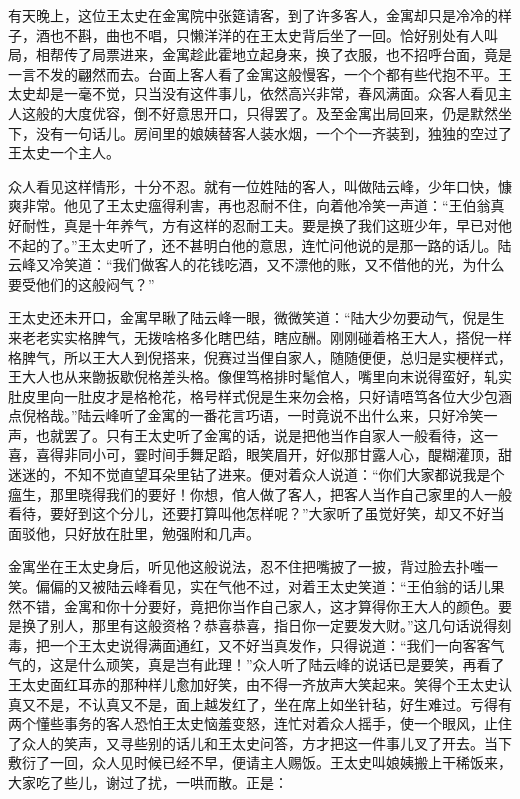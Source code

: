 \documentclass[12pt,UTF8]{ctexbook}
\begin{document}
{{{有天晚上，这位王太史在金寓院中张筵请客，到了许多客人，金寓却只是冷冷的样子，酒也不斟，曲也不唱，只懒洋洋的在王太史背后坐了一回。恰好别处有人叫局，相帮传了局票进来，金寓趁此霍地立起身来，换了衣服，也不招呼台面，竟是一言不发的翩然而去。台面上客人看了金寓这般慢客，一个个都有些代抱不平。王太史却是一毫不觉，只当没有这件事儿，依然高兴非常，春风满面。众客人看见主人这般的大度优容，倒不好意思开口，只得罢了。及至金寓出局回来，仍是默然坐下，没有一句话儿。房间里的娘姨替客人装水烟，一个个一齐装到，独独的空过了王太史一个主人。

众人看见这样情形，十分不忍。就有一位姓陆的客人，叫做陆云峰，少年口快，慷爽非常。他见了王太史瘟得利害，再也忍耐不住，向着他冷笑一声道：“王伯翁真好耐性，真是十年养气，方有这样的忍耐工夫。要是换了我们这班少年，早已对他不起的了。”王太史听了，还不甚明白他的意思，连忙问他说的是那一路的话儿。陆云峰又冷笑道：“我们做客人的花钱吃酒，又不漂他的账，又不借他的光，为什么要受他们的这般闷气？”

王太史还未开口，金寓早瞅了陆云峰一眼，微微笑道：“陆大少勿要动气，倪是生来老老实实格脾气，无拨啥格多化瞎巴结，瞎应酬。刚刚碰着格王大人，搭倪一样格脾气，所以王大人到倪搭来，倪赛过当俚自家人，随随便便，总归是实梗样式，王大人也从来朆扳歇倪格差头格。像俚笃格排时髦倌人，嘴里向末说得蛮好，轧实肚皮里向一肚皮才是格枪花，格号样式倪是生来勿会格，只好请唔笃各位大少包涵点倪格哉。”陆云峰听了金寓的一番花言巧语，一时竟说不出什么来，只好冷笑一声，也就罢了。只有王太史听了金寓的话，说是把他当作自家人一般看待，这一喜，喜得非同小可，霎时间手舞足蹈，眼笑眉开，好似那甘露人心，醍糊灌顶，甜迷迷的，不知不觉直望耳朵里钻了进来。便对着众人说道：“你们大家都说我是个瘟生，那里晓得我们的要好！你想，倌人做了客人，把客人当作自己家里的人一般看待，要好到这个分儿，还要打算叫他怎样呢？”大家听了虽觉好笑，却又不好当面驳他，只好放在肚里，勉强附和几声。

金寓坐在王太史身后，听见他这般说法，忍不住把嘴披了一披，背过脸去扑嗤一笑。偏偏的又被陆云峰看见，实在气他不过，对着王太史笑道：“王伯翁的话儿果然不错，金寓和你十分要好，竟把你当作自己家人，这才算得你王大人的颜色。要是换了别人，那里有这般资格？恭喜恭喜，指日你一定要发大财。”这几句话说得刻毒，把一个王太史说得满面通红，又不好当真发作，只得说道：“我们一向客客气气的，这是什么顽笑，真是岂有此理！”众人听了陆云峰的说话已是要笑，再看了王太史面红耳赤的那种样儿愈加好笑，由不得一齐放声大笑起来。笑得个王太史认真又不是，不认真又不是，面上越发红了，坐在席上如坐针毡，好生难过。亏得有两个懂些事务的客人恐怕王太史恼羞变怒，连忙对着众人摇手，使一个眼风，止住了众人的笑声，又寻些别的话儿和王太史问答，方才把这一件事儿叉了开去。当下敷衍了一回，众人见时候已经不早，便请主人赐饭。王太史叫娘姨搬上干稀饭来，大家吃了些儿，谢过了扰，一哄而散。正是：

}}}
\end{document}
